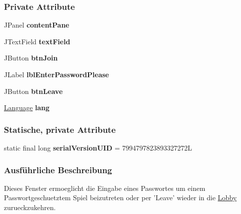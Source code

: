 \subsubsection*{Private Attribute}
\begin{DoxyCompactItemize}
\item 
\hypertarget{a00020_aee369a2eca6b8f16ea106cddf68273e8}{J\-Panel {\bfseries content\-Pane}}\label{a00020_aee369a2eca6b8f16ea106cddf68273e8}

\item 
\hypertarget{a00020_a361f69c3885676f88e8d42f906ff4e7a}{J\-Text\-Field {\bfseries text\-Field}}\label{a00020_a361f69c3885676f88e8d42f906ff4e7a}

\item 
\hypertarget{a00020_ae9c8da8c256b5ce447b1c6c812574866}{J\-Button {\bfseries btn\-Join}}\label{a00020_ae9c8da8c256b5ce447b1c6c812574866}

\item 
\hypertarget{a00020_a91722f4a7656467ea26e901db355a3c2}{J\-Label {\bfseries lbl\-Enter\-Password\-Please}}\label{a00020_a91722f4a7656467ea26e901db355a3c2}

\item 
\hypertarget{a00020_a1887f14b78aa91b00e5ce42aa504dbe2}{J\-Button {\bfseries btn\-Leave}}\label{a00020_a1887f14b78aa91b00e5ce42aa504dbe2}

\item 
\hypertarget{a00020_a430764470b3602491655161cdd67ee8c}{\hyperlink{a00015}{Language} {\bfseries lang}}\label{a00020_a430764470b3602491655161cdd67ee8c}

\end{DoxyCompactItemize}
\subsubsection*{Statische, private Attribute}
\begin{DoxyCompactItemize}
\item 
\hypertarget{a00020_a3238d314ecdee14d2966760945d00c3b}{static final long {\bfseries serial\-Version\-U\-I\-D} = 7994797823893327272\-L}\label{a00020_a3238d314ecdee14d2966760945d00c3b}

\end{DoxyCompactItemize}


\subsubsection{Ausführliche Beschreibung}
Dieses Fenster ermoeglicht die Eingabe eines Passwortes um einem Passwortgeschuetztem Spiel beizutreten oder per 'Leave' wieder in die \hyperlink{a00016}{Lobby} zurueckzukehren. 

